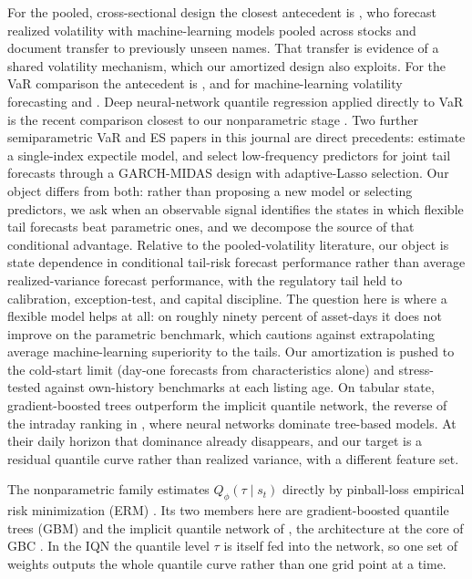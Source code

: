 \documentclass[11pt]{article}
\theoremstyle{remark}
\begin{document}
For the pooled, cross-sectional design the closest antecedent is
\citet{zhang2024commonality}, who forecast realized volatility with
machine-learning models pooled across stocks and document transfer to previously unseen names. That transfer is evidence of a shared volatility mechanism, which our amortized design also exploits. For the VaR comparison the antecedent is \citet{kuester2006}, and for machine-learning volatility forecasting \citet{bucci2020} and \citet{christensen2023ml}. Deep neural-network quantile regression applied directly to VaR is the recent comparison closest to our nonparametric stage \citep{chronopoulos2024}. Two further semiparametric VaR and ES papers in this journal are direct precedents: \citet{jiang2022singleindex} estimate a single-index expectile model, and \citet{luo2025midas} select low-frequency predictors for joint tail forecasts through a GARCH-MIDAS design with adaptive-Lasso selection. Our object differs from both: rather than proposing a new model or selecting predictors, we ask when an observable signal identifies the states in which flexible tail forecasts beat parametric ones, and we decompose the source of that conditional advantage. Relative to the pooled-volatility literature, our object is state dependence in conditional tail-risk forecast performance rather than average realized-variance forecast performance, with the regulatory tail held to calibration, exception-test, and capital discipline. The question here
is where a flexible model helps at all: on roughly ninety percent of
asset-days it does not improve on the parametric benchmark, which cautions
against extrapolating average machine-learning superiority to the tails.
Our amortization is pushed to the cold-start limit (day-one forecasts from characteristics alone) and stress-tested against own-history benchmarks at each listing age. On tabular state, gradient-boosted trees outperform the implicit quantile network, the reverse of the intraday ranking in \citet{zhang2024commonality}, where neural networks dominate tree-based models. At their daily horizon that dominance already disappears, and our target is a residual quantile curve rather than realized variance, with a different feature set.

The nonparametric family estimates $Q_\phi(\tau \mid s_t)$ directly by pinball-loss empirical risk minimization (ERM) \citep{koenker1978, steinwart2011}. Its two members here are gradient-boosted quantile trees (GBM) \citep{friedman2001, meinshausen2006} and the implicit quantile network of \citet{dabney2018iqn}, the architecture at the core of GBC \citep{polson2023gbc, nareklishvili2025gqbp}. In the IQN the quantile level $\tau$ is itself fed into the network, so one set of weights outputs the whole quantile curve rather than one grid point at a time.
\end{document}
